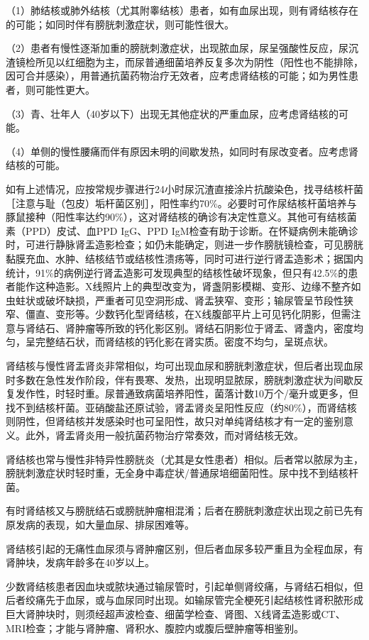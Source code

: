 （1）肺结核或肺外结核（尤其附睾结核）患者，如有血尿出现，则有肾结核存在的可能；如同时伴有膀胱刺激症状，则可能性很大。

（2）患者有慢性逐渐加重的膀胱刺激症状，出现脓血尿，尿呈强酸性反应，尿沉渣镜检所见以红细胞为主，而尿普通细菌培养反复多次为阴性（阳性也不能排除，因可合并感染），用普通抗菌药物治疗无效者，应考虑肾结核的可能；如为男性患者，则可能性更大。

（3）青、壮年人（40岁以下）出现无其他症状的严重血尿，应考虑肾结核的可能。

（4）单侧的慢性腰痛而伴有原因未明的间歇发热，如同时有尿改变者。应考虑肾结核的可能。

如有上述情况，应按常规步骤进行24小时尿沉渣直接涂片抗酸染色，找寻结核杆菌［注意与耻（包皮）垢杆菌区别］，阳性率约70\%。必要时可作尿结核杆菌培养与豚鼠接种（阳性率达约90\%），这对肾结核的确诊有决定性意义。其他可有结核菌素（PPD）皮试、血PPD
IgG、PPD
IgM检查有助于诊断。在怀疑病例未能确诊时，可进行静脉肾盂造影检查；如仍未能确定，则进一步作膀胱镜检查，可见膀胱黏膜充血、水肿、结核结节或结核性溃疡等，同时可进行逆行肾盂造影术；据国内统计，91\%的病例逆行肾盂造影可发现典型的结核性破坏现象，但只有42.5\%的患者能作这种造影。X线照片上的典型改变为，肾盏阴影模糊、变形、边缘不整齐如虫蛀状或破坏缺损，严重者可见空洞形成、肾盂狭窄、变形；输尿管呈节段性狭窄、僵直、变形等。少数钙化型肾结核，在X线腹部平片上可见钙化阴影，但需注意与肾结石、肾肿瘤等所致的钙化影区别。肾结石阴影位于肾盂、肾盏内，密度均匀，呈完整结石状，而肾结核的钙化影在肾实质。密度不均匀，呈斑点状。

肾结核与慢性肾盂肾炎非常相似，均可出现血尿和膀胱刺激症状，但后者出现血尿时多数在急性发作阶段，伴有畏寒、发热，出现明显脓尿，膀胱刺激症状为间歇反复发作性，时轻时重。尿普通致病菌培养阳性，菌落计数10万个/毫升或更多，但找不到结核杆菌。亚硝酸盐还原试验，肾盂肾炎呈阳性反应（约80\%），而肾结核则阴性，但肾结核并发感染时也可呈阳性，故只对单纯肾结核才有一定的鉴别意义。此外，肾盂肾炎用一般抗菌药物治疗常奏效，而对肾结核无效。

肾结核也常与慢性非特异性膀胱炎（尤其是女性患者）相似。后者常以脓尿为主，膀胱刺激症状时轻时重，无全身中毒症状/普通尿培细菌阳性。尿中找不到结核杆菌。

有时肾结核又与膀胱结石或膀胱肿瘤相混淆；后者在膀胱刺激症状出现之前已先有原发病的表现，如大量血尿、排尿困难等。

肾结核引起的无痛性血尿须与肾肿瘤区别，但后者血尿多较严重且为全程血尿，有肾肿块，发病年龄多在40岁以上。

少数肾结核患者因血块或脓块通过输尿管时，引起单侧肾绞痛，与肾结石相似，但后者绞痛先于血尿，或与血尿同时出现。如输尿管完全梗死引起结核性肾积脓形成巨大肾肿块时，则须经超声波检查、细菌学检查、肾图、X线肾盂造影或CT、MRI检查；才能与肾肿瘤、肾积水、腹腔内或腹后壁肿瘤等相鉴别。

